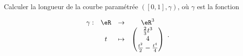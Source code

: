 \begin{exercice}\label{exoDS2011-0002}

Calculer la longueur de la courbe paramétrée $([0,1], \gamma)$, où $\gamma$ est la fonction 

\begin{equation}
  \begin{array}{cccc}
    \gamma : & \eR & \to & \eR^3\\
    \quad & t & \mapsto & 
    \begin{pmatrix}
      \frac{2}{3} t^3 \\
      4\\
      \frac{t^2}{2}-\frac{t^4}{4}
    \end{pmatrix}
  \end{array}.
\end{equation}

\end{exercice}
